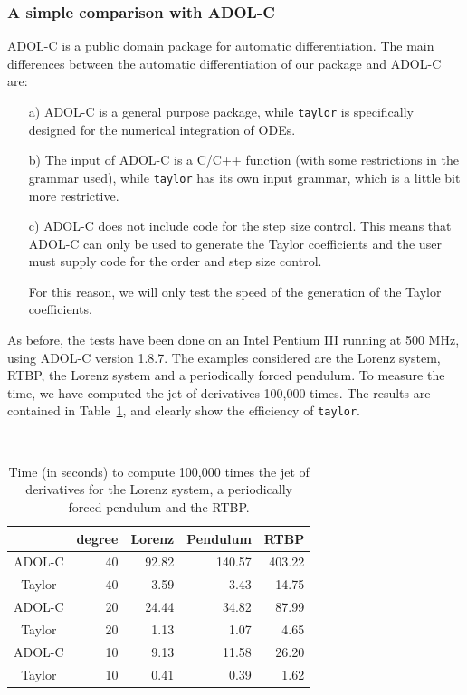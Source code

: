 \documentclass[12pt,twoside]{article}
\begin{document}
\subsubsection{A simple comparison with ADOL-C}
ADOL-C is a public domain package for automatic differentiation. The
main differences between the automatic differentiation of our package
and ADOL-C are:
\begin{itemize}
\renewcommand{\itemsep}{0pt}
\item[a)] ADOL-C is a general purpose package, while \texttt{taylor}
is specifically designed for the numerical integration of ODEs.

\item[b)] The input of ADOL-C is a C/C++ function (with some
restrictions in the grammar used), while \texttt{taylor} has its own
input grammar, which is a little bit more restrictive.

\item[c)] ADOL-C does not include code for the step size control. This
means that ADOL-C can only be used to generate the Taylor coefficients
and the user must supply code for the order and step size control.

For this reason, we will only test the speed of the generation of the
Taylor coefficients.
\end{itemize}

As before, the tests have been done on an Intel Pentium III running at
500 MHz, using ADOL-C version 1.8.7. The examples considered are the
Lorenz system, RTBP, the Lorenz system and a periodically forced
pendulum. To measure the time, we have computed the jet of derivatives
100,000 times. The results are contained in
Table~\ref{tau:adolc-taylor}, and clearly show the efficiency of
\texttt{taylor}.

\begin{table}
\begin{center}
{\tt
\begin{tabular}{|c|r|r|r|r|}\hline
   &
  \multicolumn{1}{c|}{\textrm{degree}} &
  \multicolumn{1}{c|}{\textrm{Lorenz}} &
  \multicolumn{1}{c|}{\textrm{Pendulum}} &
   \multicolumn{1}{c|}{\textrm{RTBP}} \\ \hline\hline
\textrm{ADOL-C} & 40 & 92.82 & 140.57 & 403.22\\ \hline
\textrm{Taylor} & 40 &  3.59 &   3.43 &  14.75\\ \hline\hline
\textrm{ADOL-C} & 20 & 24.44 &  34.82 &  87.99\\ \hline
\textrm{Taylor} & 20 &  1.13 &   1.07 &   4.65\\ \hline\hline
\textrm{ADOL-C} & 10 &  9.13 &  11.58 &  26.20\\ \hline
\textrm{Taylor} & 10 &  0.41 &   0.39 &   1.62\\ \hline
\end{tabular}
}
\end{center}
\caption{Time (in seconds) to compute 100,000 times the jet of
  derivatives for the Lorenz system, a periodically
  forced pendulum and the RTBP.}
\label{tau:adolc-taylor}
\end{table}
\end{document}
